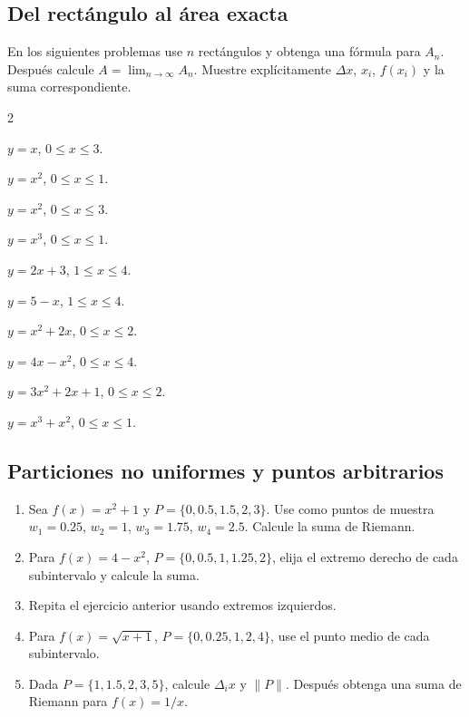 \documentclass[12pt]{article}
\begin{document}
\subsection*{Del rectángulo al área exacta}
En los siguientes problemas use $n$ rectángulos y obtenga una fórmula para
$A_n$. Después calcule
$
A=\lim_{n\to\infty}A_n.
$
Muestre explícitamente $\Delta x$, $x_i$, $f(x_i)$ y la suma correspondiente.

\begin{enumerate}[resume]
\begin{multicols}{2}
\item $y=x$, $0\le x\le3$.
\item $y=x^2$, $0\le x\le1$.
\item $y=x^2$, $0\le x\le3$.
\item $y=x^3$, $0\le x\le1$.
\item $y=2x+3$, $1\le x\le4$.
\item $y=5-x$, $1\le x\le4$.
\item $y=x^2+2x$, $0\le x\le2$.
\item $y=4x-x^2$, $0\le x\le4$.
\item $y=3x^2+2x+1$, $0\le x\le2$.
\item $y=x^3+x^2$, $0\le x\le1$.
\end{multicols}
\end{enumerate}
\subsection*{Particiones no uniformes y puntos arbitrarios}
\begin{enumerate}[resume]
\item Sea $f(x)=x^2+1$ y $P=\{0,0.5,1.5,2,3\}$. Use como puntos de muestra
$w_1=0.25$, $w_2=1$, $w_3=1.75$, $w_4=2.5$. Calcule la suma de Riemann.
\item Para $f(x)=4-x^2$, $P=\{0,0.5,1,1.25,2\}$, elija el extremo derecho de cada subintervalo y calcule la suma.
\item Repita el ejercicio anterior usando extremos izquierdos.
\item Para $f(x)=\sqrt{x+1}$, $P=\{0,0.25,1,2,4\}$, use el punto medio de cada subintervalo.
\item Dada $P=\{1,1.5,2,3,5\}$, calcule $\Delta_i x$ y $\|P\|$. Después obtenga una suma de Riemann para $f(x)=1/x$.
\end{enumerate}
\end{document}
